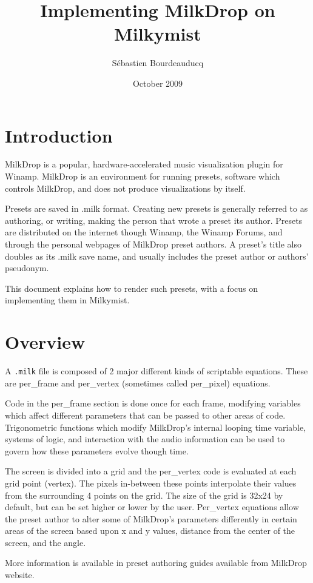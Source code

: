 \documentclass[a4paper,11pt]{article}
\title{Implementing MilkDrop on Milkymist}
\author{S\'ebastien Bourdeauducq}
\date{October 2009}
\begin{document}
\setlength{\parindent}{0pt}
\setlength{\parskip}{5pt}
\maketitle{}
\section{Introduction}
MilkDrop is a popular, hardware-accelerated music visualization plugin for Winamp. MilkDrop is an environment for running presets, software which controls MilkDrop, and does not produce visualizations by itself.

Presets are saved in .milk format. Creating new presets is generally referred to as authoring, or writing, making the person that wrote a preset its author. Presets are distributed on the internet though Winamp, the Winamp Forums, and through the personal webpages of MilkDrop preset authors. A preset's title also doubles as its .milk save name, and usually includes the preset author or authors' pseudonym.

This document explains how to render such presets, with a focus on implementing them in Milkymist.

\section{Overview}
A \verb!.milk! file is composed of 2 major different kinds of scriptable equations. These are per\_frame and per\_vertex (sometimes called per\_pixel) equations.

Code in the per\_frame section is done once for each frame, modifying variables which affect different parameters that can be passed to other areas of code. Trigonometric functions which modify MilkDrop's internal looping time variable, systems of logic, and interaction with the audio information can be used to govern how these parameters evolve though time.

The screen is divided into a grid and the per\_vertex code is evaluated at each grid point (vertex). The pixels in-between these points interpolate their values from the surrounding 4 points on the grid. The size of the grid is 32x24 by default, but can be set higher or lower by the user. Per\_vertex equations allow the preset author to alter some of MilkDrop's parameters differently in certain areas of the screen based upon x and y values, distance from the center of the screen, and the angle.

More information is available in preset authoring guides available from MilkDrop website.
\end{document}
